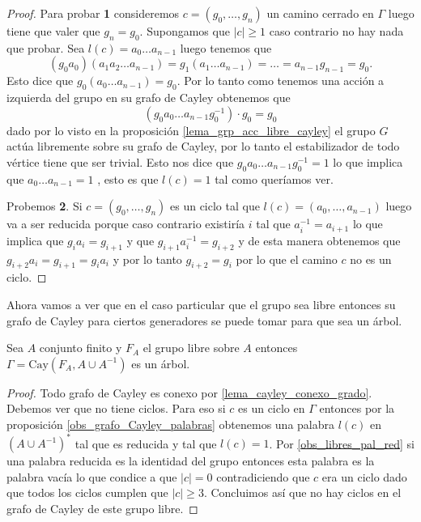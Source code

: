 \documentclass[tesis.tex]{subfiles}
\begin{document}
\begin{proof}
	Para probar \textbf{1} consideremos $c = (g_{0}, \dots, g_{n})$ un camino cerrado en $\Gamma$ luego tiene que valer que $g_{n} = g_{0}$.
	Supongamos que $|c| \ge 1$ caso contrario no hay nada que probar.
	Sea $l(c) = a_{0} \dots a_{n-1}$ luego tenemos que 
	\[
		(g_{0}a_{0})(a_{1}a_{2} \dots a_{n-1}) = g_{1}(a_{1} \dots a_{n-1}) = \dots = a_{n-1}g_{n-1} =  g_{0}.
	\] 
	Esto dice que $g_{0}(a_{0} \dots a_{n-1}) = g_{0}$.
	Por lo tanto como tenemos una acción a izquierda del grupo en su grafo de Cayley obtenemos que 
	\[
		(g_{0} a_{0} \dots a_{n-1} g_{0}^{-1}) \cdot g_{0} = g_{0}
	\] 
	dado por lo visto en la proposición \ref{lema_grp_acc_libre_cayley} el grupo $G$ actúa libremente sobre su grafo de Cayley, por lo tanto el estabilizador de todo vértice tiene que ser trivial.
	Esto nos dice que 
	$g_{0} a_{0} \dots a_{n-1} g_{0}^{-1}  = 1$ lo que implica que $a_{0} \dots a_{n-1} = 1$ , esto es que $l(c) = 1$ tal como queríamos ver.
	
	Probemos \textbf{2}.
	Si $c = (g_{0}, \dots, g_{n})$ es un ciclo tal que $l(c) = (a_{0}, \dots, a_{n-1})$ luego va a ser reducida porque caso contrario existiría $i$ tal que $a_{i}^{-1} = a_{i+1}$ lo que implica que $g_{i}a_{i} = g_{i+1}$ y que $g_{i+1}a_{i}^{-1} = g_{i+2}$ y de esta manera obtenemos que $g_{i+2}a_{i} = g_{i+1} = g_{i}a_{i}$ y por lo tanto $g_{i+2} = g_{i}$ por lo que el camino $c$ no es un ciclo.
	
\end{proof}


Ahora vamos a ver que en el caso particular que el grupo sea libre entonces su grafo de Cayley para ciertos generadores se puede tomar para que sea un árbol.

\begin{lema}\label{lema_cayley_libre_arbol}
	Sea $A$ conjunto finito y $F_{A}$ el grupo libre sobre $A$ entonces $\Gamma = \text{Cay}(F_{A},A \cup A^{-1})$ es un árbol.
\end{lema}

\begin{proof}
	Todo grafo de Cayley es conexo por \ref{lema_cayley_conexo_grado}.
	Debemos ver que no tiene ciclos.
	Para eso si $c$ es un ciclo en $\Gamma$ entonces por la proposición \ref{obs_grafo_Cayley_palabras} obtenemos una palabra $l(c)$ en $(A \cup A^{-1})^*$ tal que es {reducida} y tal que $l(c) = 1$.
	Por \ref{obs_libres_pal_red} si una palabra reducida es la identidad del grupo entonces esta palabra es la palabra vacía lo que condice a que $|c|=0$ contradiciendo que $c$ era un ciclo dado que todos los ciclos cumplen que $|c| \ge 3$.
	Concluimos así que no hay ciclos en el grafo de Cayley de este grupo libre.
	
\end{proof}
\end{document}
